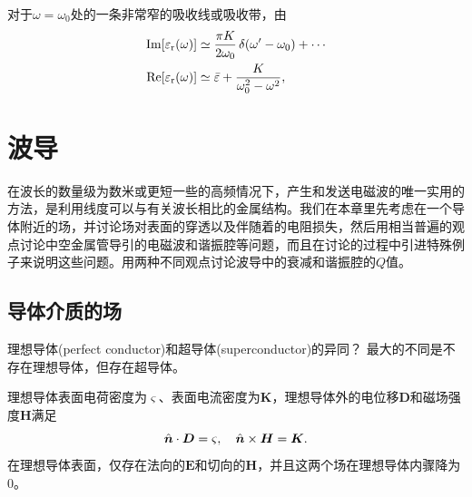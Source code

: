 对于$\omega=\omega_0$处的一条非常窄的吸收线或吸收带，由
\begin{align*}
    \operatorname{Im}[\varepsilon_\text r(\omega)]&\simeq\frac{\pi K}{2\omega_0}\mathop{}\!\delta(\omega'-\omega_0)+\cdots\\
    \operatorname{Re}[\varepsilon_\text r(\omega)]&\simeq\bar\varepsilon+\frac K{\omega_0^2-\omega^2},
\end{align*}
\clearpage
\section{波导}
\label{sec:waveguide}
在波长的数量级为数米或更短一些的高频情况下，产生和发送电磁波的唯一实用的方法，是利用线度可以与有关波长相比的金属结构。我们在本章里先考虑在一个导体附近的场，并讨论场对表面的穿透以及伴随着的电阻损失，然后用相当普遍的观点讨论中空金属管导引的电磁波和谐振腔等问题，而且在讨论的过程中引进特殊例子来说明这些问题。用两种不同观点讨论波导中的衰减和谐振腔的$Q$值。%

\subsection{导体介质的场}
理想导体(perfect conductor)和超导体(superconductor)的异同？
最大的不同是不存在理想导体，但存在超导体。

理想导体表面电荷密度为$\varsigma$、表面电流密度为$\bm K$，理想导体外的电位移$\bm D$和磁场强度$\bm H$满足
\[
    \mathop{}\!\hat{\bm n}\cdot\bm D=\varsigma,\quad\mathop{}\!\hat{\bm n}\times\bm H=\bm K.
\]
在理想导体表面，仅存在法向的$\bm E$和切向的$\bm H$，并且这两个场在理想导体内骤降为0。

